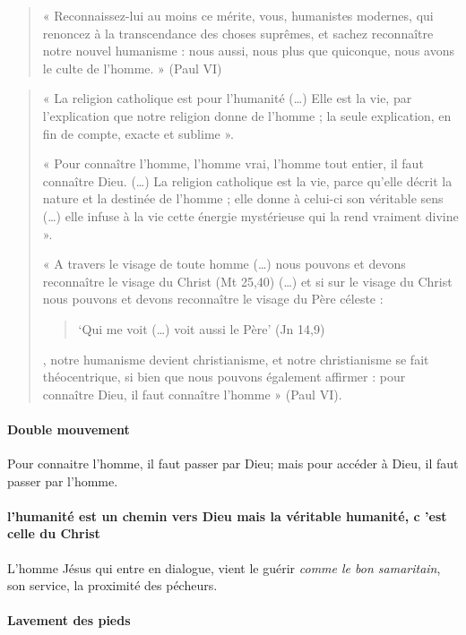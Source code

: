 \begin{quote}
    « Reconnaissez-lui au moins ce mérite, vous, humanistes modernes, qui renoncez à la transcendance des choses suprêmes, et sachez reconnaître notre nouvel humanisme : nous aussi, nous plus que quiconque, nous avons le culte de l'homme. » (Paul VI) 
        
    \end{quote}
    \begin{quote}
    « La religion catholique est pour l’humanité (…) Elle est la vie, par l’explication que notre religion donne de l’homme ; la seule explication, en fin de compte, exacte et sublime ».
    
    « Pour connaître l’homme, l’homme vrai, l’homme tout entier, il faut connaître Dieu.  (…) La religion catholique est la vie, parce qu’elle décrit la nature et la destinée de l’homme ; elle donne à celui-ci son véritable sens (…) elle infuse à la vie cette énergie mystérieuse qui la rend vraiment divine ». 
    
    « A travers le visage de toute homme (…) nous pouvons et devons reconnaître le visage du Christ (Mt 25,40) (…) et si sur le visage du Christ nous pouvons et devons reconnaître le visage du Père céleste : \begin{quote}
        ‘Qui me voit (…) voit aussi le Père’ (Jn 14,9)
    \end{quote}, notre humanisme devient christianisme, et notre christianisme se fait théocentrique, si bien que nous pouvons également affirmer : pour connaître Dieu, il faut connaître l’homme » (Paul VI). 
\end{quote}

\paragraph{Double mouvement} Pour connaitre l'homme, il faut passer par Dieu; mais pour accéder à Dieu, il faut passer par l'homme.

\paragraph{l'humanité est un chemin vers Dieu mais la véritable humanité, c 'est celle du Christ} L'homme Jésus qui entre en dialogue, vient le guérir \textit{comme le bon samaritain}, son service, la proximité des pécheurs.

\paragraph{Lavement des pieds}

